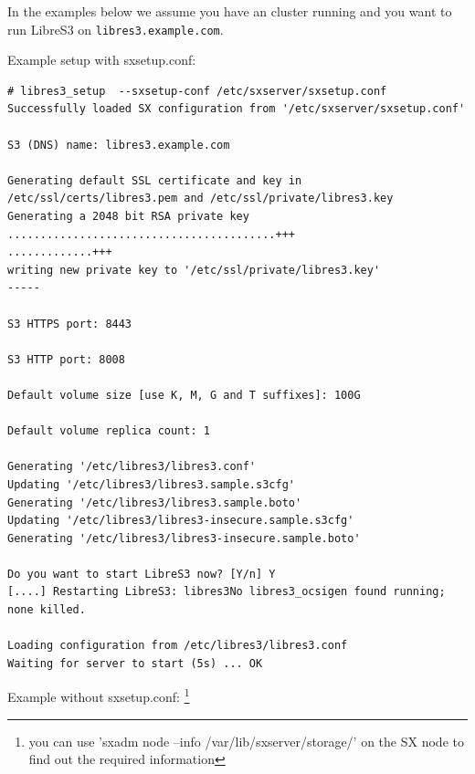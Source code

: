 In the examples below we assume you
have an \SX cluster running and you want to run
LibreS3 on \verb|libres3.example.com|.

Example setup with sxsetup.conf:

\begin{lstlisting}
# libres3_setup  --sxsetup-conf /etc/sxserver/sxsetup.conf
Successfully loaded SX configuration from '/etc/sxserver/sxsetup.conf'

S3 (DNS) name: libres3.example.com

Generating default SSL certificate and key in /etc/ssl/certs/libres3.pem and /etc/ssl/private/libres3.key
Generating a 2048 bit RSA private key
.........................................+++
.............+++
writing new private key to '/etc/ssl/private/libres3.key'
-----

S3 HTTPS port: 8443

S3 HTTP port: 8008

Default volume size [use K, M, G and T suffixes]: 100G

Default volume replica count: 1

Generating '/etc/libres3/libres3.conf'
Updating '/etc/libres3/libres3.sample.s3cfg'
Generating '/etc/libres3/libres3.sample.boto'
Updating '/etc/libres3/libres3-insecure.sample.s3cfg'
Generating '/etc/libres3/libres3-insecure.sample.boto'

Do you want to start LibreS3 now? [Y/n] Y
[....] Restarting LibreS3: libres3No libres3_ocsigen found running; none killed.

Loading configuration from /etc/libres3/libres3.conf
Waiting for server to start (5s) ... OK
\end{lstlisting}


Example without sxsetup.conf:
\footnote{you can use 'sxadm node --info /var/lib/sxserver/storage/' on the SX node to find out the required information}


